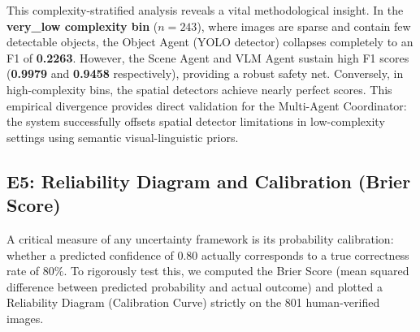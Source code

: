 \documentclass[12pt,onecolumn,a4paper]{IEEEtran}
\begin{document}
\begin{table}[!htbp]
\centering
\caption{E4: Agent F1 by Scene Complexity Bin (Human-Verified Labels, $n=801$) [Provenance: Expert Human Ground-Truth].}
\label{tab:gold_eval_e4}
\end{table}

This complexity-stratified analysis reveals a vital methodological insight. In the \textbf{very\_low complexity bin} ($n=243$), where images are sparse and contain few detectable objects, the Object Agent (YOLO detector) collapses completely to an F1 of \textbf{0.2263}. However, the Scene Agent and VLM Agent sustain high F1 scores (\textbf{0.9979} and \textbf{0.9458} respectively), providing a robust safety net. Conversely, in high-complexity bins, the spatial detectors achieve nearly perfect scores. This empirical divergence provides direct validation for the Multi-Agent Coordinator: the system successfully offsets spatial detector limitations in low-complexity settings using semantic visual-linguistic priors.

\subsection{E5: Reliability Diagram and Calibration (Brier Score)}
\label{sec:expert_calibration}

A critical measure of any uncertainty framework is its probability calibration: whether a predicted confidence of $0.80$ actually corresponds to a true correctness rate of $80\%$. To rigorously test this, we computed the Brier Score (mean squared difference between predicted probability and actual outcome) and plotted a Reliability Diagram (Calibration Curve) strictly on the 801 human-verified images.
\end{document}
